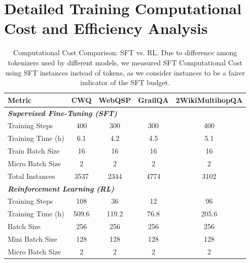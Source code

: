 \section{Detailed Training Computational Cost and Efficiency Analysis}
\begin{table}[t]
\centering
\caption{Computational Cost Comparison: SFT vs. RL. Due to difference among tokenizers used by different models, we measured SFT Computational Cost using SFT instances instead of tokens, as we consider instances to be a fairer indicator of the SFT budget.}
\label{tab:training_comparison}
\renewcommand{\arraystretch}{1.2} 
\begin{tabular}{lcccc}
\toprule
Metric & CWQ & WebQSP & GrailQA & 2WikiMultihopQA \\
\midrule
\multicolumn{5}{l}{\textit{\textbf{Supervised Fine-Tuning (SFT)}}} \\ 
\quad Training Steps & 400 & 300 & 300 & 400 \\
\quad Training Time (h) & 6.1 & 4.2 & 4.5 & 5.1 \\
\quad Train Batch Size & 16 & 16 & 16 & 16 \\ 
\quad Micro Batch Size & 2 & 2 & 2 & 2 \\
\quad Total Instances & 3537 & 2344 & 4774 & 3102 \\ 
\midrule
\multicolumn{5}{l}{\textit{\textbf{Reinforcement Learning (RL)}}} \\
\quad Training Steps & 108 & 36 & 12 & 96 \\
\quad Training Time (h) & 509.6 & 119.2 & 76.8 & 205.6 \\
\quad Batch Size & 256 & 256 & 256 & 256 \\ 
\quad Mini Batch Size & 128 & 128 & 128 & 128 \\
\quad Micro Batch Size & 2 & 2 & 2 & 2 \\
 
\bottomrule
\end{tabular}
\end{table}

